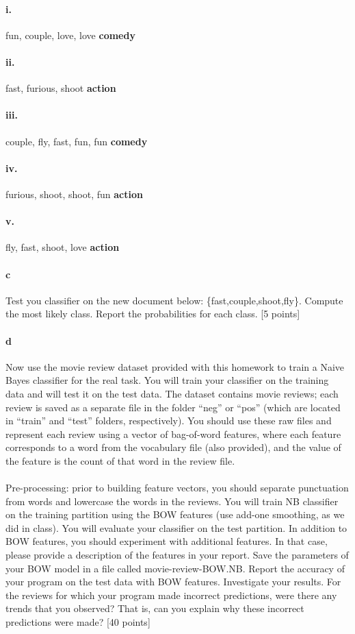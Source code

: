 \documentclass{article}
\begin{document}
\paragraph{i.} fun, couple, love, love \textbf{comedy}
\paragraph{ii.} fast, furious, shoot \textbf{action}
\paragraph{iii.} couple, fly, fast, fun, fun \textbf{comedy}
\paragraph{iv.} furious, shoot, shoot, fun \textbf{action}
\paragraph{v.} fly, fast, shoot, love \textbf{action}

\paragraph{c} Test you classifier on the new document below: \{fast,couple,shoot,fly\}. Compute the most likely class. Report the probabilities for each class. [5 points]

\paragraph{d} Now use the movie review dataset provided with this homework to train a Naive Bayes classifier for the real task. You will train your classifier on the training data and will test it on the test data. The dataset contains movie reviews; each review is saved as a separate file in the folder “neg” or “pos” (which are located in “train” and “test” folders, respectively). You should use these raw files and represent each review using a vector of bag-of-word features, where each feature corresponds to a word from the vocabulary file (also provided), and the value of the feature is the count of that word in the review file.

\paragraph{} Pre-processing: prior to building feature vectors, you should separate punctuation from words and lowercase the words in the reviews. You will train NB classifier on the training partition using the BOW features (use add-one smoothing, as we did in class). You will evaluate your classifier on the test partition. In addition to BOW features, you should experiment with additional features. In that case, please provide a description of the features in your report. Save the parameters of your BOW model in a file called movie-review-BOW.NB\@. Report the accuracy of your program on the test data with BOW features.
Investigate your results. For the reviews for which your program made incorrect predictions, were there any trends that you observed? That is, can you explain why these incorrect predictions were made? [40 points]
\end{document}
